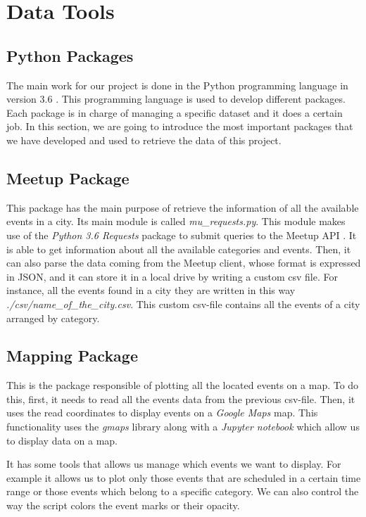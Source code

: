 \section{Data Tools}\label{sec:toolsanddata}
\subsection*{Python Packages} 
The main work for our project is done in the Python programming language in version 3.6 \cite{python}. This programming language is used to develop different packages. Each package is in charge of managing a specific dataset and it does a certain job. In this section, we are going to introduce the most important packages that we have developed and used to retrieve the data of this project.

\subsection*{Meetup Package}
This package has the main purpose of retrieve the information of all the available events in a city. Its main module is called \textit{mu\_requests.py}. This module makes use of the \textit{Python 3.6 Requests} package \cite{requests} to submit queries to the Meetup API \cite{meetupapi}. It is able to get information about all the available categories and events. Then, it can also parse the data coming from the Meetup client, whose format is expressed in JSON, and it can store it in a local drive by writing a custom csv file. For instance, all the events found in a city they are written in this way \textit{./csv/name\_of\_the\_city.csv}. This custom csv-file contains all the events of a city arranged by category.

\subsection*{Mapping Package}
This is the package responsible of plotting all the located events on a map. To do this, first, it needs to read all the events data from the previous csv-file. Then, it uses the read coordinates to display events on a \emph{Google Maps} map. This functionality uses the \textit{gmaps} library \cite{gmaps} along with a \textit{Jupyter notebook} \cite{jupyter} which allow us to display data on a map.

It has some tools that allows us manage which events we want to display. For example it allows us to plot only those events that are scheduled in a certain time range or those events which belong to a specific category. We can also control the way the script colors the event marks or their opacity.

